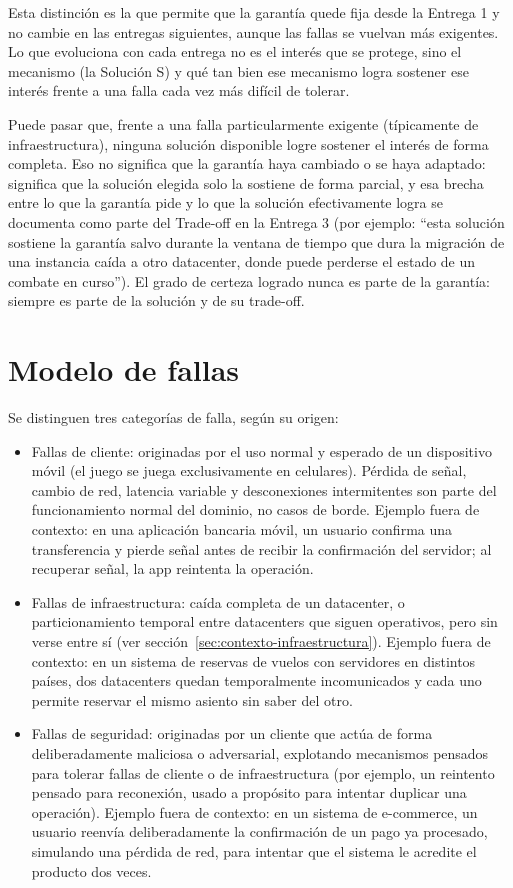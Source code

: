 \documentclass[variant=guia,cover=institutional,mode=screen]{ua-engineering-v6-article}
\begin{document}
    Esta distinción es la que permite que la garantía quede fija desde la Entrega 1 y no cambie en las entregas siguientes, aunque las fallas se vuelvan más exigentes.
    Lo que evoluciona con cada entrega no es el interés que se protege, sino el mecanismo (la Solución S) y qué tan bien ese mecanismo logra sostener ese interés frente a una falla cada vez más difícil de tolerar.

    Puede pasar que, frente a una falla particularmente exigente (típicamente de infraestructura), ninguna solución disponible logre sostener el interés de forma completa.
    Eso no significa que la garantía haya cambiado o se haya adaptado: significa que la solución elegida solo la sostiene de forma parcial, y esa brecha entre lo que la garantía pide y lo que la solución efectivamente logra se documenta como parte del Trade-off en la Entrega 3 (por ejemplo: ``esta solución sostiene la garantía salvo durante la ventana de tiempo que dura la migración de una instancia caída a otro datacenter, donde puede perderse el estado de un combate en curso'').
    El grado de certeza logrado nunca es parte de la garantía: siempre es parte de la solución y de su trade-off.

    \section{Modelo de fallas}\label{sec:modelo-fallas}

    Se distinguen tres categorías de falla, según su origen:

    \begin{itemize}
        \item Fallas de cliente: originadas por el uso normal y esperado de un dispositivo móvil (el juego se juega exclusivamente en celulares).
        Pérdida de señal, cambio de red, latencia variable y desconexiones intermitentes son parte del funcionamiento normal del dominio, no casos de borde.
        Ejemplo fuera de contexto: en una aplicación bancaria móvil, un usuario confirma una transferencia y pierde señal antes de recibir la confirmación del servidor; al recuperar señal, la app reintenta la operación.
        \item Fallas de infraestructura: caída completa de un datacenter, o particionamiento temporal entre datacenters que siguen operativos, pero sin verse entre sí (ver sección~\ref{sec:contexto-infraestructura}).
        Ejemplo fuera de contexto: en un sistema de reservas de vuelos con servidores en distintos países, dos datacenters quedan temporalmente incomunicados y cada uno permite reservar el mismo asiento sin saber del otro.
        \item Fallas de seguridad: originadas por un cliente que actúa de forma deliberadamente maliciosa o adversarial, explotando mecanismos pensados para tolerar fallas de cliente o de infraestructura (por ejemplo, un reintento pensado para reconexión, usado a propósito para intentar duplicar una operación).
        Ejemplo fuera de contexto: en un sistema de e-commerce, un usuario reenvía deliberadamente la confirmación de un pago ya procesado, simulando una pérdida de red, para intentar que el sistema le acredite el producto dos veces.
    \end{itemize}
\end{document}
